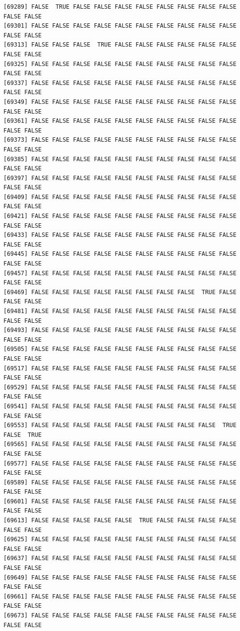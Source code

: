 \documentclass[
  a4paper,
  DIV=11,
  numbers=noendperiod]{scrartcl}
\begin{document}
\begin{verbatim}
[69289] FALSE  TRUE FALSE FALSE FALSE FALSE FALSE FALSE FALSE FALSE FALSE FALSE
[69301] FALSE FALSE FALSE FALSE FALSE FALSE FALSE FALSE FALSE FALSE FALSE FALSE
[69313] FALSE FALSE FALSE  TRUE FALSE FALSE FALSE FALSE FALSE FALSE FALSE FALSE
[69325] FALSE FALSE FALSE FALSE FALSE FALSE FALSE FALSE FALSE FALSE FALSE FALSE
[69337] FALSE FALSE FALSE FALSE FALSE FALSE FALSE FALSE FALSE FALSE FALSE FALSE
[69349] FALSE FALSE FALSE FALSE FALSE FALSE FALSE FALSE FALSE FALSE FALSE FALSE
[69361] FALSE FALSE FALSE FALSE FALSE FALSE FALSE FALSE FALSE FALSE FALSE FALSE
[69373] FALSE FALSE FALSE FALSE FALSE FALSE FALSE FALSE FALSE FALSE FALSE FALSE
[69385] FALSE FALSE FALSE FALSE FALSE FALSE FALSE FALSE FALSE FALSE FALSE FALSE
[69397] FALSE FALSE FALSE FALSE FALSE FALSE FALSE FALSE FALSE FALSE FALSE FALSE
[69409] FALSE FALSE FALSE FALSE FALSE FALSE FALSE FALSE FALSE FALSE FALSE FALSE
[69421] FALSE FALSE FALSE FALSE FALSE FALSE FALSE FALSE FALSE FALSE FALSE FALSE
[69433] FALSE FALSE FALSE FALSE FALSE FALSE FALSE FALSE FALSE FALSE FALSE FALSE
[69445] FALSE FALSE FALSE FALSE FALSE FALSE FALSE FALSE FALSE FALSE FALSE FALSE
[69457] FALSE FALSE FALSE FALSE FALSE FALSE FALSE FALSE FALSE FALSE FALSE FALSE
[69469] FALSE FALSE FALSE FALSE FALSE FALSE FALSE FALSE  TRUE FALSE FALSE FALSE
[69481] FALSE FALSE FALSE FALSE FALSE FALSE FALSE FALSE FALSE FALSE FALSE FALSE
[69493] FALSE FALSE FALSE FALSE FALSE FALSE FALSE FALSE FALSE FALSE FALSE FALSE
[69505] FALSE FALSE FALSE FALSE FALSE FALSE FALSE FALSE FALSE FALSE FALSE FALSE
[69517] FALSE FALSE FALSE FALSE FALSE FALSE FALSE FALSE FALSE FALSE FALSE FALSE
[69529] FALSE FALSE FALSE FALSE FALSE FALSE FALSE FALSE FALSE FALSE FALSE FALSE
[69541] FALSE FALSE FALSE FALSE FALSE FALSE FALSE FALSE FALSE FALSE FALSE FALSE
[69553] FALSE FALSE FALSE FALSE FALSE FALSE FALSE FALSE FALSE  TRUE FALSE  TRUE
[69565] FALSE FALSE FALSE FALSE FALSE FALSE FALSE FALSE FALSE FALSE FALSE FALSE
[69577] FALSE FALSE FALSE FALSE FALSE FALSE FALSE FALSE FALSE FALSE FALSE FALSE
[69589] FALSE FALSE FALSE FALSE FALSE FALSE FALSE FALSE FALSE FALSE FALSE FALSE
[69601] FALSE FALSE FALSE FALSE FALSE FALSE FALSE FALSE FALSE FALSE FALSE FALSE
[69613] FALSE FALSE FALSE FALSE FALSE  TRUE FALSE FALSE FALSE FALSE FALSE FALSE
[69625] FALSE FALSE FALSE FALSE FALSE FALSE FALSE FALSE FALSE FALSE FALSE FALSE
[69637] FALSE FALSE FALSE FALSE FALSE FALSE FALSE FALSE FALSE FALSE FALSE FALSE
[69649] FALSE FALSE FALSE FALSE FALSE FALSE FALSE FALSE FALSE FALSE FALSE FALSE
[69661] FALSE FALSE FALSE FALSE FALSE FALSE FALSE FALSE FALSE FALSE FALSE FALSE
[69673] FALSE FALSE FALSE FALSE FALSE FALSE FALSE FALSE FALSE FALSE FALSE FALSE

\end{verbatim}
\end{document}
